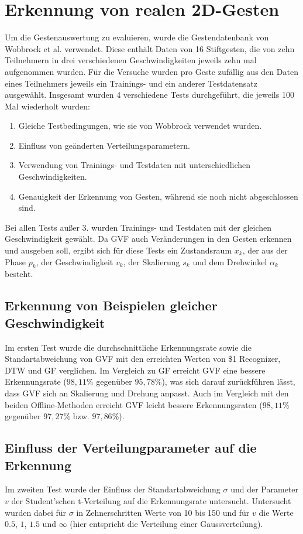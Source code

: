 \documentclass{llncs}
\begin{document}
\section{Erkennung von realen 2D-Gesten}
Um die Gestenauswertung zu evaluieren, wurde die Gestendatenbank von Wobbrock et al.\cite{Wobbrock2007} verwendet. Diese enthält Daten von 16 Stiftgesten, die von zehn Teilnehmern in drei verschiedenen Geschwindigkeiten jeweils zehn mal aufgenommen wurden. Für die Versuche wurden pro Geste zufällig aus den Daten eines Teilnehmers jeweils ein Trainings- und ein anderer Testdatensatz ausgewählt. Insgesamt wurden 4 verschiedene Tests durchgeführt, die jeweils 100 Mal wiederholt wurden:
\begin{enumerate}
\item Gleiche Testbedingungen, wie sie von Wobbrock\cite{Wobbrock2007} verwendet wurden.
\item Einfluss von geänderten Verteilungsparametern.
\item Verwendung von Trainings- und Testdaten mit unterschiedlichen Geschwindigkeiten.
\item Genauigkeit der Erkennung von Gesten, während sie noch nicht abgeschlossen sind.
\end{enumerate}
Bei allen Tests außer 3. wurden Trainings- und Testdaten mit der gleichen Geschwindigkeit gewählt.
Da GVF auch Veränderungen in den Gesten erkennen und ausgeben soll, ergibt sich für diese Tests ein Zustandsraum $x_k$, der aus der Phase $p_k$, der Geschwindigkeit $v_k$, der Skalierung $s_k$ und dem Drehwinkel $\alpha_k$ besteht.

\subsection{Erkennung von Beispielen gleicher Geschwindigkeit}
Im ersten Test wurde die durchschnittliche Erkennungsrate sowie die Standartabweichung von GVF mit den erreichten Werten von \$1 Recognizer\cite{Wobbrock2007}, DTW und GF verglichen. 
Im Vergleich zu GF erreicht GVF eine bessere Erkennungsrate ($98,11 \%$ gegenüber $95,78\%$), was sich darauf zurückführen lässt, dass GVF sich an Skalierung und Drehung anpasst.
Auch im Vergleich mit den beiden Offline-Methoden erreicht GVF leicht bessere Erkennungsraten ($98,11\%$ gegenüber $97,27\%$ bzw. $97,86\%$).

\subsection{Einfluss der Verteilungparameter auf die Erkennung}
Im zweiten Test wurde der Einfluss der Standartabweichung $\sigma$ und der Parameter $v$ der Student'schen t-Verteilung auf die Erkennungsrate untersucht. Untersucht wurden dabei für $\sigma$ in Zehnerschritten Werte von 10 bis 150 und für $v$ die Werte $0.5$, $1$, $1.5$ und $\infty$ (hier entspricht die Verteilung einer Gaussverteilung).
\end{document}
